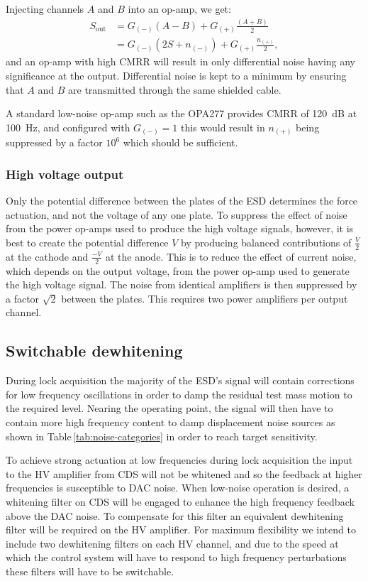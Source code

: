 Injecting channels $A$ and $B$ into an op-amp, we get:
\begin{align}
  S_{\text{out}} &= G_{\left(-\right)} \left(A - B\right) + G_{\left(+\right)} \frac{\left(A + B\right)}{2} \\
                 &= G_{\left(-\right)} \left(2S + n_{\left(-\right)}\right) + G_{\left(+\right)} \frac{n_{\left(+\right)}}{2},
\end{align}
and an op-amp with high \gls{CMRR} will result in only differential noise having any significance at the output. Differential noise is kept to a minimum by ensuring that $A$ and $B$ are transmitted through the same shielded cable.

A standard low-noise op-amp such as the OPA277 provides \gls{CMRR} of \SI{120}{\deci\bel} at \SI{100}{\hertz}, and configured with $G_{\left(-\right)} = 1$ this would result in $n_{\left(+\right)}$ being suppressed by a factor $10^6$ which should be sufficient.

\subsubsection{High voltage output}
Only the potential difference between the plates of the \gls{ESD} determines the force actuation, and not the voltage of any one plate. To suppress the effect of noise from the power op-amps used to produce the high voltage signals, however, it is best to create the potential difference $V$ by producing balanced contributions of $\frac{V}{2}$ at the cathode and $\frac{-V}{2}$ at the anode. This is to reduce the effect of current noise, which depends on the output voltage, from the power op-amp used to generate the high voltage signal. The noise from identical amplifiers is then suppressed by a factor $\sqrt{2}$ between the plates. This requires two power amplifiers per output channel.

\subsection{Switchable dewhitening}
During lock acquisition the majority of the \gls{ESD}'s signal will contain corrections for low frequency oscillations in order to damp the residual test mass motion to the required level. Nearing the operating point, the signal will then have to contain more high frequency content to damp displacement noise sources as shown in Table\,\ref{tab:noise-categories} in order to reach target sensitivity.

To achieve strong actuation at low frequencies during lock acquisition the input to the \gls{HV} amplifier from \gls{CDS} will not be whitened and so the feedback at higher frequencies is susceptible to \gls{DAC} noise. When low-noise operation is desired, a whitening filter on \gls{CDS} will be engaged to enhance the high frequency feedback above the \gls{DAC} noise. To compensate for this filter an equivalent dewhitening filter will be required on the \gls{HV} amplifier. For maximum flexibility we intend to include two dewhitening filters on each \gls{HV} channel, and due to the speed at which the control system will have to respond to high frequency perturbations these filters will have to be switchable.

